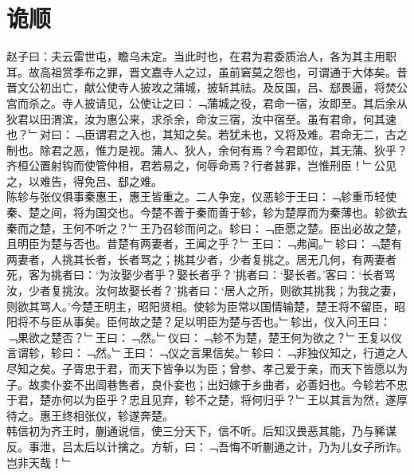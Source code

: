 \chapter{诡顺}%
赵子曰：夫云雷世屯，瞻乌未定。当此时也，在君为君委质治人，各为其主用职耳。故高祖赏季布之罪，晋文嘉寺人之过，虽前窘莫之怨也，可谓通于大体矣。昔晋文公初出亡，献公使寺人披攻之蒲城，披斩其祛。及反国，吕、郄畏逼，将焚公宫而杀之。寺人披请见，公使让之曰：﹁蒲城之役，君命一宿，汝即至。其后余从狄君以田渭滨，汝为惠公来，求杀余，命汝三宿，汝中宿至。虽有君命，何其速也？﹂对曰：﹁臣谓君之入也，其知之矣。若犹未也，又将及难。君命无二，古之制也。除君之恶，惟力是视。蒲人、狄人，余何有焉？今君即位，其无蒲、狄乎？齐桓公置射钩而使管仲相，君若易之，何辱命焉？行者甚罪，岂惟刑臣！﹂公见之，以难告，得免吕、郄之难。
\\
陈轸与张仪俱事秦惠王，惠王皆重之。二人争宠，仪恶轸于王曰：﹁轸重币轻使秦、楚之间，将为国交也。今楚不善于秦而善于轸，轸为楚厚而为秦薄也。轸欲去秦而之楚，王何不听之？﹂王乃召轸而问之。轸曰：﹁臣愿之楚。臣出必故之楚，且明臣为楚与否也。昔楚有两妻者，王闻之乎？﹂王曰：﹁弗闻。﹂轸曰：﹁楚有两妻者，人挑其长者，长者骂之；挑其少者，少者复挑之。居无几何，有两妻者死，客为挑者曰：‘为汝娶少者乎？娶长者乎？’挑者曰：‘娶长者。’客曰：‘长者骂汝，少者复挑汝。汝何故娶长者？’挑者曰：‘居人之所，则欲其挑我；为我之妻，则欲其骂人。’今楚王明主，昭阳贤相。使轸为臣常以国情输楚，楚王将不留臣，昭阳将不与臣从事矣。臣何故之楚？足以明臣为楚与否也。﹂轸出，仪入问王曰：﹁果欲之楚否？﹂王曰：﹁然。﹂仪曰：﹁轸不为楚，楚王何为欲之？﹂王复以仪言谓轸，轸曰：﹁然。﹂王曰：﹁仪之言果信矣。﹂轸曰：﹁非独仪知之，行道之人尽知之矣。子胥忠于君，而天下皆争以为臣；曾参、孝己爱于亲，而天下皆愿以为子。故卖仆妾不出闾巷售者，良仆妾也；出妇嫁于乡曲者，必善妇也。今轸若不忠于君，楚亦何以为臣乎？忠且见弃，轸不之楚，将何归乎？﹂王以其言为然，遂厚待之。惠王终相张仪，轸遂奔楚。
\\
韩信初为齐王时，蒯通说信，使三分天下，信不听。后知汉畏恶其能，乃与豨谋反。事泄，吕太后以计擒之。方斩，曰：﹁吾悔不听蒯通之计，乃为儿女子所诈。岂非天哉！﹂
